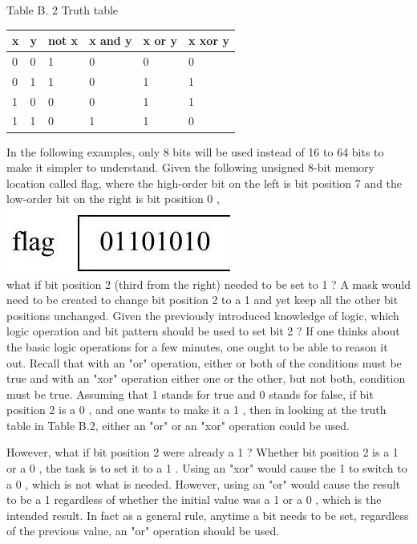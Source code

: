 \documentclass[10pt]{article}
\begin{document}
Table B. 2 Truth table

\begin{center}
\begin{tabular}{|l|l|l|l|l|l|}
\hline
x & y & not x & x and y & x or y & x xor y \\
\hline
0 & 0 & 1 & 0 & 0 & 0 \\
\hline
0 & 1 & 1 & 0 & 1 & 1 \\
\hline
1 & 0 & 0 & 0 & 1 & 1 \\
\hline
1 & 1 & 0 & 1 & 1 & 0 \\
\hline
\end{tabular}
\end{center}

In the following examples, only 8 bits will be used instead of 16 to 64 bits to make it simpler to understand. Given the following unsigned 8-bit memory location called flag, where the high-order bit on the left is bit position 7 and the low-order bit on the right is bit position 0 ,\\
\includegraphics[max width=\textwidth, center]{2025_03_24_ebe50cc223a6fbc49eecg-309}\\
what if bit position 2 (third from the right) needed to be set to 1 ? A mask would need to be created to change bit position 2 to a 1 and yet keep all the other bit positions unchanged. Given the previously introduced knowledge of logic, which logic operation and bit pattern should be used to set bit 2 ? If one thinks about the basic logic operations for a few minutes, one ought to be able to reason it out. Recall that with an "or" operation, either or both of the conditions must be true and with an "xor" operation either one or the other, but not both, condition must be true. Assuming that 1 stands for true and 0 stands for false, if bit position 2 is a 0 , and one wants to make it a 1 , then in looking at the truth table in Table B.2, either an "or" or an "xor" operation could be used.

However, what if bit position 2 were already a 1 ? Whether bit position 2 is a 1 or a 0 , the task is to set it to a 1 . Using an "xor" would cause the 1 to switch to a 0 , which is not what is needed. However, using an "or" would cause the result to be a 1 regardless of whether the initial value was a 1 or a 0 , which is the intended result. In fact as a general rule, anytime a bit needs to be set, regardless of the previous value, an "or" operation should be used.
\end{document}
